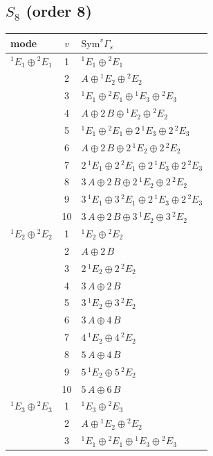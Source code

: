 \documentclass[11pt]{article}
\begin{document}
\subsection*{$S_{8}$ \quad (order 8)}
\begin{longtable}{l c p{}}
\hline mode & $v$ & $\mathrm{Sym}^v\Gamma_s$\\ \hline\endhead
${}^{1}E_{1}\oplus {}^{2}E_{1}$ & 1 & ${}^{1}E_{1}\oplus {}^{2}E_{1}$\\
 & 2 & $A\oplus {}^{1}E_{2}\oplus {}^{2}E_{2}$\\
 & 3 & ${}^{1}E_{1}\oplus {}^{2}E_{1}\oplus {}^{1}E_{3}\oplus {}^{2}E_{3}$\\
 & 4 & $A\oplus 2\,B\oplus {}^{1}E_{2}\oplus {}^{2}E_{2}$\\
 & 5 & ${}^{1}E_{1}\oplus {}^{2}E_{1}\oplus 2\,{}^{1}E_{3}\oplus 2\,{}^{2}E_{3}$\\
 & 6 & $A\oplus 2\,B\oplus 2\,{}^{1}E_{2}\oplus 2\,{}^{2}E_{2}$\\
 & 7 & $2\,{}^{1}E_{1}\oplus 2\,{}^{2}E_{1}\oplus 2\,{}^{1}E_{3}\oplus 2\,{}^{2}E_{3}$\\
 & 8 & $3\,A\oplus 2\,B\oplus 2\,{}^{1}E_{2}\oplus 2\,{}^{2}E_{2}$\\
 & 9 & $3\,{}^{1}E_{1}\oplus 3\,{}^{2}E_{1}\oplus 2\,{}^{1}E_{3}\oplus 2\,{}^{2}E_{3}$\\
 & 10 & $3\,A\oplus 2\,B\oplus 3\,{}^{1}E_{2}\oplus 3\,{}^{2}E_{2}$\\
\hline
${}^{1}E_{2}\oplus {}^{2}E_{2}$ & 1 & ${}^{1}E_{2}\oplus {}^{2}E_{2}$\\
 & 2 & $A\oplus 2\,B$\\
 & 3 & $2\,{}^{1}E_{2}\oplus 2\,{}^{2}E_{2}$\\
 & 4 & $3\,A\oplus 2\,B$\\
 & 5 & $3\,{}^{1}E_{2}\oplus 3\,{}^{2}E_{2}$\\
 & 6 & $3\,A\oplus 4\,B$\\
 & 7 & $4\,{}^{1}E_{2}\oplus 4\,{}^{2}E_{2}$\\
 & 8 & $5\,A\oplus 4\,B$\\
 & 9 & $5\,{}^{1}E_{2}\oplus 5\,{}^{2}E_{2}$\\
 & 10 & $5\,A\oplus 6\,B$\\
\hline
${}^{1}E_{3}\oplus {}^{2}E_{3}$ & 1 & ${}^{1}E_{3}\oplus {}^{2}E_{3}$\\
 & 2 & $A\oplus {}^{1}E_{2}\oplus {}^{2}E_{2}$\\
 & 3 & ${}^{1}E_{1}\oplus {}^{2}E_{1}\oplus {}^{1}E_{3}\oplus {}^{2}E_{3}$\\

\end{longtable}
\end{document}
